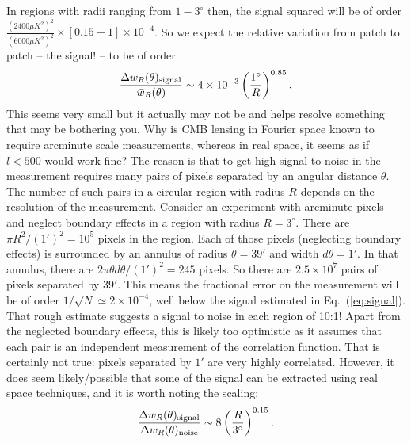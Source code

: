 \documentclass[prd,amsmath,amssymb,floatfix,superscriptaddress,nofootinbib]{revtex4-1}
\def\be{\begin{equation}}
\def\ee{\end{equation}}
\newcommand{\ec}[1]{Eq.~(\ref{eq:#1})}
\newcommand{\eql}[1]{\label{eq:#1}}
\begin{document}
In regions with radii ranging from $1-3^\circ$ then, the signal squared will be of order $\frac{(2400 \mu K^2)^2}{(6000 \mu K^2)^2}\times [0.15-1]\times 10^{-4}$.  So we expect the relative variation from patch to patch -- the signal! -- to be of order
\be
\frac{\Delta w_R(\theta)_{\rm signal}}{\bar w_R(\theta)} \sim 4\times 10^{-3} \left(\frac{1^\circ}{R}\right)^{0.85}.\eql{signal}\ee
This seems very small but it actually may not be and helps resolve something that may be bothering you. Why is CMB lensing in Fourier space known to require arcminute scale measurements, whereas in real space, it seems as if $l<500$ would work fine? The reason is that to get high signal to noise in the measurement requires many pairs of pixels separated by an angular distance $\theta$. The number of such pairs in a circular region with radius $R$ depends on the resolution of the measurement. Consider an experiment with arcminute pixels and neglect boundary effects in a region with radius $R=3^\circ$. There are $\pi R^2/(1')^2=10^5$ pixels in the region. Each of those pixels (neglecting boundary effects) is surrounded by an annulus  of radius $\theta=39'$ and width $d\theta=1'$. In that annulus, there are $2\pi \theta d\theta/(1')^2=245$ pixels. So there are $2.5\times 10^7$ pairs of pixels separated by $39'$. This means the fractional error on the measurement will be of order $1/\sqrt{N}\simeq 2\times 10^{-4}$, well below the signal estimated in \ec{signal}. That rough estimate suggests a signal to noise in each region of 10:1! Apart from the neglected boundary effects, this is likely too optimistic as it assumes that each pair is an independent measurement of the correlation function. That is certainly not true: pixels separated by $1'$ are very highly correlated. However, it does seem likely/possible that some of the signal can be extracted using real space techniques, and it is worth noting the scaling:
\be
\frac{\Delta w_R(\theta)_{\rm signal}}{\Delta w_R(\theta)_{\rm noise}} \sim 8 \left( \frac{R}{3^\circ} \right)^{0.15}.\ee
\end{document}
